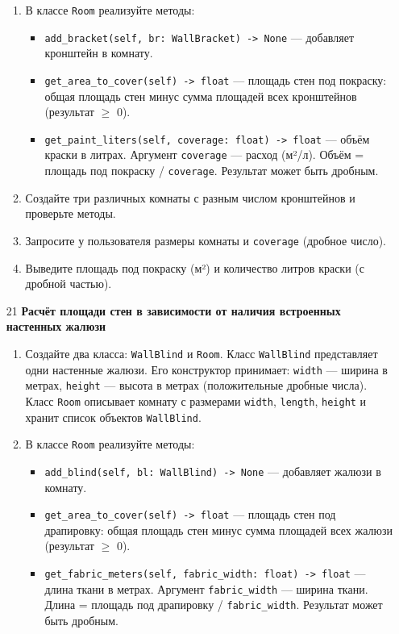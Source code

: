 \begin{enumerate}
\begin{enumerate}
    \item В классе \texttt{Room} реализуйте методы:  
    \begin{itemize}
        \item \texttt{add\_bracket(self, br: WallBracket) -> None} — добавляет кронштейн в комнату.
        \item \texttt{get\_area\_to\_cover(self) -> float} — площадь стен под покраску: общая площадь стен минус сумма площадей всех кронштейнов (результат $\geqslant$ 0).
        \item \texttt{get\_paint\_liters(self, coverage: float) -> float} — объём краски в литрах. Аргумент \texttt{coverage} — расход (м²/л). Объём = площадь под покраску / \texttt{coverage}. Результат может быть дробным.
    \end{itemize}

    \item Создайте три различных комнаты с разным числом кронштейнов и проверьте методы.

    \item Запросите у пользователя размеры комнаты и \texttt{coverage} (дробное число).

    \item Выведите площадь под покраску (м²) и количество литров краски (с дробной частью).
\end{enumerate}

\item[21] \textbf{Расчёт площади стен в зависимости от наличия встроенных настенных жалюзи}
\begin{enumerate}
    \item Создайте два класса: \texttt{WallBlind} и \texttt{Room}.  
    Класс \texttt{WallBlind} представляет одни настенные жалюзи. Его конструктор принимает:  
    \texttt{width} — ширина в метрах,  
    \texttt{height} — высота в метрах (положительные дробные числа).  
    Класс \texttt{Room} описывает комнату с размерами \texttt{width}, \texttt{length}, \texttt{height} и хранит список объектов \texttt{WallBlind}.

    \item В классе \texttt{Room} реализуйте методы:  
    \begin{itemize}
        \item \texttt{add\_blind(self, bl: WallBlind) -> None} — добавляет жалюзи в комнату.
        \item \texttt{get\_area\_to\_cover(self) -> float} — площадь стен под драпировку: общая площадь стен минус сумма площадей всех жалюзи (результат $\geqslant$ 0).
        \item \texttt{get\_fabric\_meters(self, fabric\_width: float) -> float} — длина ткани в метрах. Аргумент \texttt{fabric\_width} — ширина ткани. Длина = площадь под драпировку / \texttt{fabric\_width}. Результат может быть дробным.
    \end{itemize}


\end{enumerate}
\end{enumerate}
